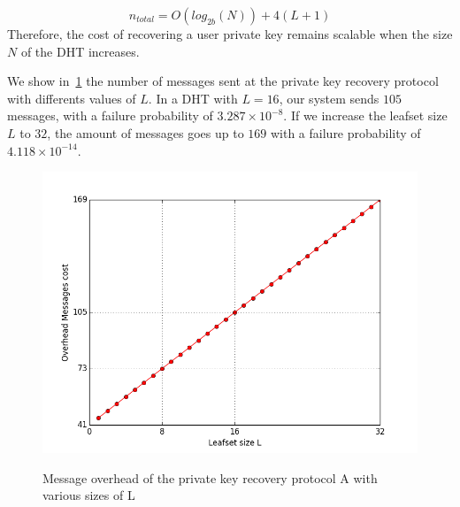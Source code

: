     $$
      n_{total} = O(log_{2b}(N)) + 4(L+1)
    $$
    Therefore, the cost of recovering a user private key remains
scalable when the size $N$ of the DHT increases.

    We show in~\ref{fig:private_key_recovery_a_messages} the number of messages sent at
the private key recovery protocol with differents values of $L$. In a DHT with
$L = 16$, our system sends $105$ messages, with a failure probability of
 $3.287 \times 10^{-8}$. If we increase the leafset size $L$ to $32$, the amount of
messages goes up to $169$ with a failure probability of $4.118 \times 10^{-14}$.

\begin{figure}[!htb]
\centering
\includegraphics[width=14cm]{../plots/private_key_recovery_a_messages}\\
\caption{Message overhead of the private key recovery protocol A with various sizes of L}
\label{fig:private_key_recovery_a_messages}
\end{figure}

